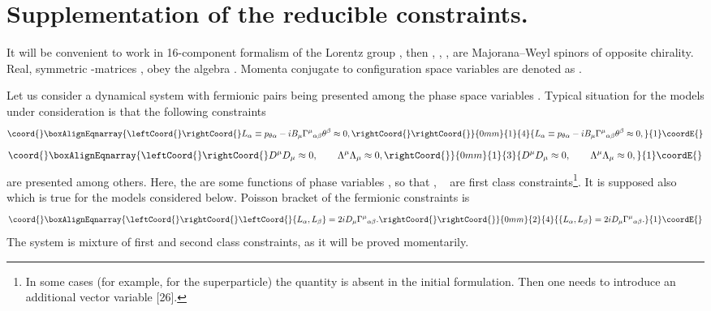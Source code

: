 \documentclass[a4paper]{article}
\begin{document}
\section{Supplementation of the reducible constraints.} 

It will be convenient to work in 16-component formalism of the Lorentz
group \coordHE{},
then \myHighlight{$\theta^\alpha$}\coordHE{}, \myHighlight{$\psi_\alpha$}\coordHE{}, \coordHE{}, are
Majorana--Weyl spinors of opposite chirality. Real, symmetric
\coordHE{}  \myHighlight{$\Gamma$}\coordHE{}-matrices \myHighlight{${\Gamma^\mu}_{\alpha\beta}$}\coordHE{},
\myHighlight{$\tilde\Gamma^{\mu\alpha\beta}$}\coordHE{} obey the algebra
\myHighlight{$\Gamma^\mu\tilde\Gamma^\nu+\Gamma^\nu\tilde\Gamma^\mu=-2\eta^{\mu\nu},
~ \eta^{\mu\nu}=(+,-, \ldots ,-)$}\coordHE{}.
Momenta conjugate to configuration space variables \coordHE{}
are denoted as \coordHE{}.

Let us consider a dynamical system with fermionic pairs \coordHE{} being presented among the phase space variables \coordHE{}.
Typical situation for the models under consideration is that the following
constraints
\begin{eqnarray}\coord{}\boxAlignEqnarray{\leftCoord{}\rightCoord{}\label{1}
L_\alpha\equiv p_{\theta\alpha}- iB_\mu{\Gamma^\mu}_{\alpha\beta}
\theta^\beta\approx 0, \rightCoord{}
\rightCoord{}}{0mm}{1}{4}{L_\alpha\equiv p_{\theta\alpha}- iB_\mu{\Gamma^\mu}_{\alpha\beta}
\theta^\beta\approx 0, 
}{1}\coordE{}\end{eqnarray}
\begin{eqnarray}\coord{}\boxAlignEqnarray{\leftCoord{}\rightCoord{}\label{3}
D^\mu D_\mu\approx0, \qquad 
\Lambda^\mu\Lambda_\mu\approx0, 
\rightCoord{}}{0mm}{1}{3}{D^\mu D_\mu\approx0, \qquad 
\Lambda^\mu\Lambda_\mu\approx0, 
}{1}\coordE{}\end{eqnarray}
are presented among others.
Here, the \coordHE{} 
are some functions of phase variables
\coordHE{}, so that \coordHE{}, ~ \coordHE{} are first class 
constraints\footnote{In some 
cases (for example, for the superparticle) the quantity \myHighlight{$\Lambda^\mu$}\coordHE{} 
is absent in the initial formulation. Then one needs to introduce an 
additional vector variable [26].}. It is supposed also 
\coordHE{} which is true for the models considered below. 
Poisson bracket of the fermionic constraints is
\begin{eqnarray}\coord{}\boxAlignEqnarray{\leftCoord{}\rightCoord{}\label{2}
\leftCoord{}\{L_\alpha,L_\beta\}=2iD_\mu{\Gamma^\mu}_{\alpha\beta}.\rightCoord{}
\rightCoord{}}{0mm}{2}{4}{\{L_\alpha,L_\beta\}=2iD_\mu{\Gamma^\mu}_{\alpha\beta}.
}{1}\coordE{}\end{eqnarray}
The system \coordHE{} is mixture of first and second class
constraints, as it will be proved momentarily. 
\end{document}
